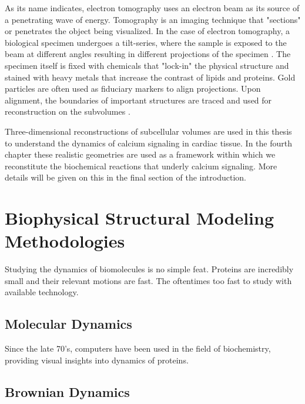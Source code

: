 \documentclass[12pt]{ucsddissertation}
\begin{document}
\begin{dissertationintroduction}
As its name indicates, electron tomography uses an electron beam as its source of a penetrating wave of energy. Tomography is an imaging technique that "sections" or penetrates the object being visualized. In the case of electron tomography, a biological specimen undergoes a tilt-series, where the sample is exposed to the beam at different angles resulting in different projections of the specimen \cite{Fridman2012,Koning2018}. The specimen itself is fixed with chemicals that "lock-in" the physical structure and stained with heavy metals that increase the contrast of lipids and proteins. Gold particles are often used as fiduciary markers to align projections. Upon alignment, the boundaries of important structures are traced and used for reconstruction on the subvolumes \cite{Yu2008,Lee2018}.

Three-dimensional reconstructions of subcellular volumes are used in this thesis to understand the dynamics of calcium signaling in cardiac tissue\cite{Hayashi2009}. In the fourth chapter these realistic geometries are used as a framework within which we reconstitute the biochemical reactions that underly calcium signaling. More details will be given on this in the final section of the introduction.   

\section{Biophysical Structural Modeling Methodologies}
Studying the dynamics of biomolecules is no simple feat. Proteins are incredibly small and their relevant motions are fast. The oftentimes too fast to study with available technology. 

\subsection{Molecular Dynamics}
Since the late 70's, computers have been used in the field of biochemistry, providing visual insights into dynamics of proteins\cite{McCammon1979}. 

 
\subsection{Brownian Dynamics}

\end{dissertationintroduction}
\end{document}
